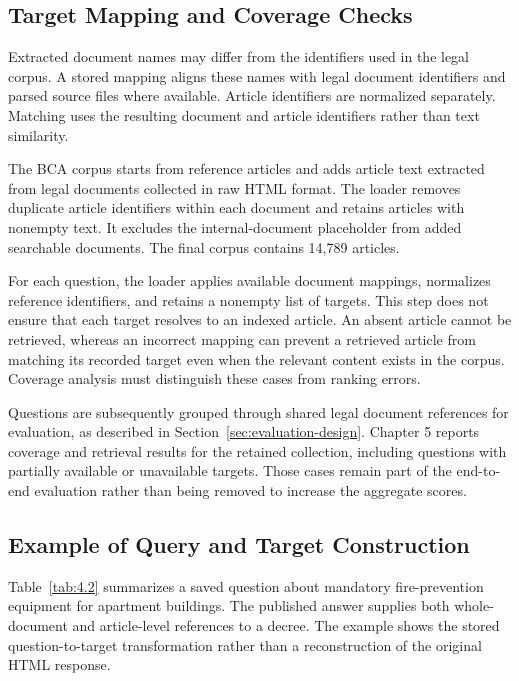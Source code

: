 \subsection{Target Mapping and Coverage Checks}

Extracted document names may differ from the identifiers used in the legal corpus. A stored mapping aligns these names with legal document identifiers and parsed source files where available. Article identifiers are normalized separately. Matching uses the resulting document and article identifiers rather than text similarity.

The BCA corpus starts from reference articles and adds article text extracted from legal documents collected in raw HTML format. The loader removes duplicate article identifiers within each document and retains articles with nonempty text. It excludes the internal-document placeholder from added searchable documents. The final corpus contains 14,789 articles.

For each question, the loader applies available document mappings, normalizes reference identifiers, and retains a nonempty list of targets. This step does not ensure that each target resolves to an indexed article. An absent article cannot be retrieved, whereas an incorrect mapping can prevent a retrieved article from matching its recorded target even when the relevant content exists in the corpus. Coverage analysis must distinguish these cases from ranking errors.

Questions are subsequently grouped through shared legal document references for evaluation, as described in Section~\ref{sec:evaluation-design}. Chapter 5 reports coverage and retrieval results for the retained collection, including questions with partially available or unavailable targets. Those cases remain part of the end-to-end evaluation rather than being removed to increase the aggregate scores.

\subsection{Example of Query and Target Construction}

Table~\ref{tab:4.2} summarizes a saved question about mandatory fire-prevention equipment for apartment buildings. The published answer supplies both whole-document and article-level references to a decree. The example shows the stored question-to-target transformation rather than a reconstruction of the original HTML response.

